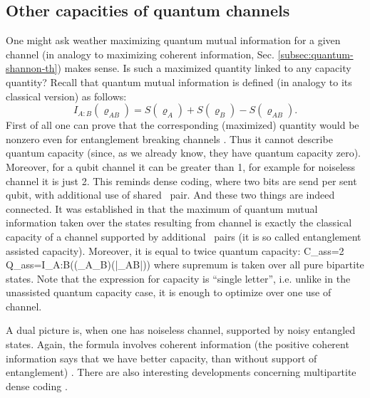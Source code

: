 \documentclass[twocolumn,aps,rmp]{revtex4}
\begin{document}
\subsection{Other capacities of quantum channels}
\label{subsec:dense-cap}
One might ask weather maximizing quantum mutual information for a
given channel (in analogy to maximizing coherent information,
Sec. \ref{subsec:quantum-shannon-th}) makes sense. Is such a maximized
quantity linked to any capacity quantity?  Recall that quantum mutual
information is defined (in analogy to its classical version) as
follows:
\begin{equation}
I_{A:B}(\varrho_{AB})=S(\varrho_{A}) + S(\varrho_{B}) -
S(\varrho_{AB}). \label{MutualInfo}
\end{equation}
First of all one can prove that the corresponding (maximized) quantity would be nonzero even
for entanglement breaking channels
\cite{AdamiC1996-neumann-cap,BelavkinO1998-mutual}. Thus it cannot
describe quantum capacity (since, as we already know, they have
quantum capacity zero). Moreover, for a qubit channel it can be
greater than 1, for example for noiseless channel it is just 2. This
reminds dense coding, where two bits are send per sent qubit, with
additional use of shared \epr\ pair. And these two things are indeed
connected. It was established in
\cite{BennettSST1999-eacap,BennettSST-eacap2001} that
the maximum of quantum mutual information taken over the states
resulting from channel is exactly the classical capacity of a channel
supported by additional \epr\ pairs (it is so called entanglement
assisted capacity).  Moreover, it is equal to twice quantum capacity:
\be
C_{ass}=2 Q_{ass}=\sup I_{A:B}\bigl((\id_A\ot \Lambda_B)(|\psi\>_{AB}\<\psi|)\bigl)
\ee
where supremum is taken over all pure bipartite states.
Note that the expression for capacity  is ``single letter'', i.e. unlike in the unassisted quantum capacity case, it is enough to optimize over one use of channel.

A dual picture is, when one has noiseless
channel, supported by noisy entangled states. Again, the formula
involves coherent information (the positive coherent information
says that we have better capacity, than without support of
entanglement) \cite{Bowen-dense,HHH-IBM-dense}.
There are also interesting developments concerning multipartite dense coding
\cite{BrussALMSS2005-multidense,HorodeckiP2006-multidense}.
\end{document}
